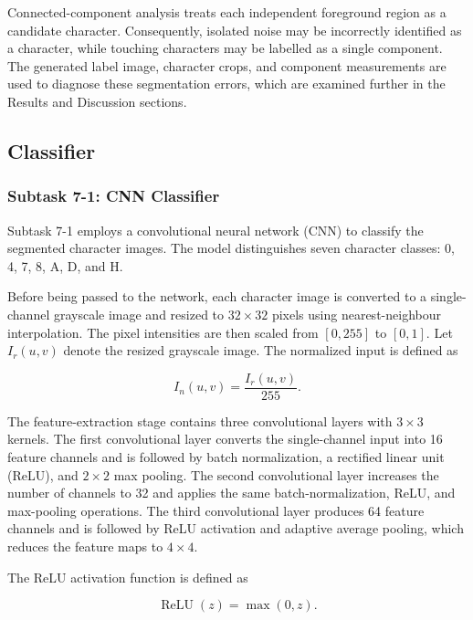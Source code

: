 \documentclass[conference]{IEEEtran}
\begin{document}
Connected-component analysis treats each independent foreground region
as a candidate character. Consequently, isolated noise may be
incorrectly identified as a character, while touching characters may
be labelled as a single component. The generated label image,
character crops, and component measurements are used to diagnose these
segmentation errors, which are examined further in the Results and
Discussion sections.

\subsection{Classifier}

\subsubsection{Subtask 7-1: CNN Classifier}

Subtask 7-1 employs a convolutional neural network (CNN) to classify the
segmented character images. The model distinguishes seven character
classes: 0, 4, 7, 8, A, D, and H.

Before being passed to the network, each character image is converted
to a single-channel grayscale image and resized to $32\times32$ pixels
using nearest-neighbour interpolation. The pixel intensities are then
scaled from $[0,255]$ to $[0,1]$. Let $I_r(u,v)$ denote the resized
grayscale image. The normalized input is defined as

\begin{equation}
I_n(u,v)=\frac{I_r(u,v)}{255}.
\label{eq:cnn_normalization}
\end{equation}

The feature-extraction stage contains three convolutional layers with
$3\times3$ kernels. The first convolutional layer converts the
single-channel input into 16 feature channels and is followed by batch
normalization, a rectified linear unit (ReLU), and $2\times2$ max
pooling. The second convolutional layer increases the number of
channels to 32 and applies the same batch-normalization, ReLU, and
max-pooling operations. The third convolutional layer produces 64
feature channels and is followed by ReLU activation and adaptive
average pooling, which reduces the feature maps to $4\times4$.

The ReLU activation function is defined as

\begin{equation}
\operatorname{ReLU}(z)=\max(0,z).
\label{eq:relu}
\end{equation}
\end{document}

